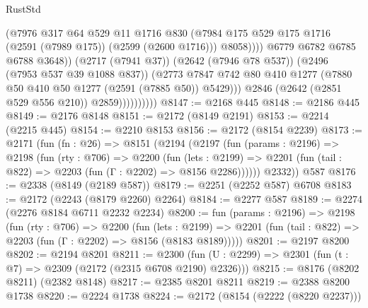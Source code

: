 \begin{lexlean}{RustStd}
\begin{coremodule}
                                    (@7976
                                      @317
                                      @64
                                      @529
                                      @11
                                      @1716
                                      @830
                                      (@7984
                                        @175
                                        @529
                                        @175
                                        @1716
                                        (@2591 (@7989 @175))
                                        (@2599 (@2600 @1716)))
                                      @8058))))
                              @6779
                              @6782
                              @6785
                              @6788
                              @3648))
                          (@2717 (@7941 @37))
                          (@2642 (@7946 @78 @537))
                          (@2496 (@7953 @537 @39 @1088 @837))
                          (@2773
                            @7847
                            @742
                            @80
                            @410
                            @1277
                            (@7880 @50 @410 @50 @1277 (@2591 (@7885 @50)) @5429)))
                        @2846
                        (@2642 (@2851 @529 @556 @210))
                        @2859))))))))))
@8147 := @2168 @445
@8148 := @2186 @445
@8149 := @2176 @8148
@8151 := @2172 (@8149 @2191)
@8153 := @2214 (@2215 @445)
@8154 := @2210 @8153
@8156 := @2172 (@8154 @2239)
@8173 := @2171
    (fun (fn : @26) =>
    @8151
      (@2194
        (@2197
          (fun (params : @2196) =>
          @2198
            (fun (rty : @706) =>
            @2200
              (fun (lets : @2199) =>
              @2201 (fun (tail : @822) => @2203 (fun (Γ : @2202) => @8156 @2286))))))
        @2332))
    @587
@8176 := @2338 (@8149 (@2189 @587))
@8179 := @2251 (@2252 @587) @6708
@8183 := @2172 (@2243 (@8179 @2260) @2264)
@8184 := @2277 @587
@8189 := @2274 (@2276 @8184 @6711 @2232 @2234)
@8200 := fun (params : @2196) =>
  @2198
    (fun (rty : @706) =>
    @2200
      (fun (lets : @2199) =>
      @2201 (fun (tail : @822) => @2203 (fun (Γ : @2202) => @8156 (@8183 @8189)))))
@8201 := @2197 @8200
@8202 := @2194 @8201
@8211 := @2300 (fun (U : @2299) => @2301 (fun (t : @7) => @2309 (@2172 (@2315 @6708 @2190) @2326)))
@8215 := @8176 (@8202 @8211) (@2382 @8148)
@8217 := @2385 @8201 @8211
@8219 := @2388 @8200 @1738
@8220 := @2224 @1738
@8224 := @2172 (@8154 (@2222 (@8220 @2237)))

\end{coremodule}
\end{lexlean}
